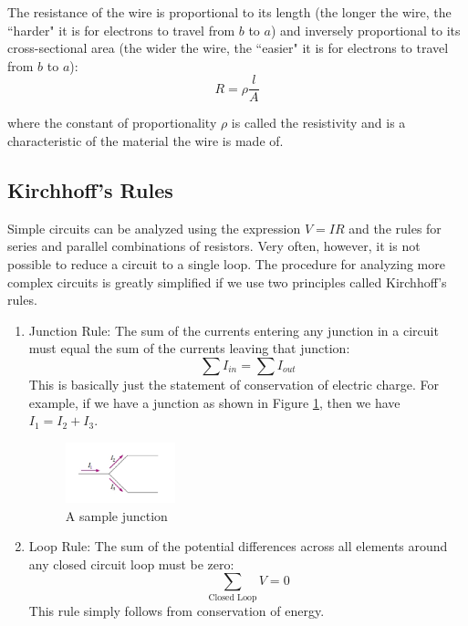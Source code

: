 The resistance of the wire is proportional to its length (the longer the wire, the ``harder" it is for electrons to travel from $b$ to $a$) and inversely proportional to its cross-sectional area (the wider the wire, the ``easier" it is for electrons to travel from $b$ to $a$):
\begin{equation}
	R = \rho \frac{l}{A}
\end{equation}

where the constant of proportionality $\rho$ is called the resistivity and is a characteristic of the material the wire is made of.

\subsection{Kirchhoff's Rules}

Simple circuits can be analyzed using the expression $V = IR$ and the rules for series and parallel combinations of resistors. Very often, however, it is not possible to reduce a circuit to a single loop. The procedure for analyzing more complex circuits is greatly simplified if we use two principles called Kirchhoff's rules.\myskip

\begin{enumerate}
	\item Junction Rule: The sum of the currents entering any junction in a circuit must equal the sum of the currents leaving that junction:
	\begin{equation}
		\sum I_{in} = \sum I_{out}
	\end{equation}
	This is basically just the statement of conservation of electric charge. For example, if we have a junction as shown in Figure \ref{fig:junction}, then we have $I_1 = I_2 + I_3$.

	\begin{figure}[h]
	\centering
	\includegraphics[width=0.3\textwidth]{./Exp2/pic/junction.png}
	\caption{A sample junction}
	\label{fig:junction}
	\end{figure}

	\item Loop Rule: The sum of the potential differences across all elements around any closed circuit loop must be zero:
	\begin{equation}
		\sum_{\text{Closed Loop}} V = 0
	\end{equation}
	This rule simply follows from conservation of energy.

\end{enumerate}

